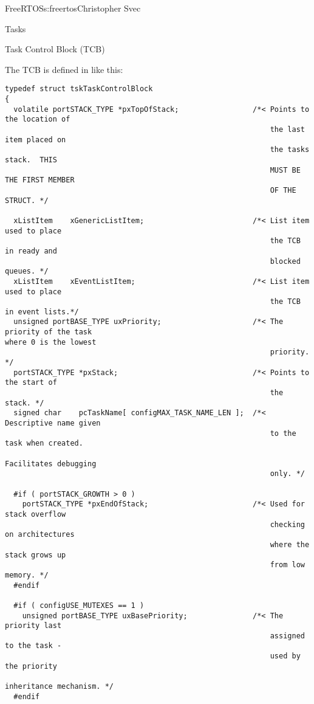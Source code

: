 \begin{aosachapter}{FreeRTOS}{s:freertos}{Christopher Svec}
\begin{aosasect1}{Tasks}
\begin{aosasect2}{Task Control Block (TCB)}

The TCB is defined in  like this:

\begin{verbatim}
typedef struct tskTaskControlBlock
{
  volatile portSTACK_TYPE *pxTopOfStack;                 /*< Points to the location of
                                                             the last item placed on 
                                                             the tasks stack.  THIS 
                                                             MUST BE THE FIRST MEMBER 
                                                             OF THE STRUCT. */
                                                         
  xListItem    xGenericListItem;                         /*< List item used to place 
                                                             the TCB in ready and 
                                                             blocked queues. */
  xListItem    xEventListItem;                           /*< List item used to place 
                                                             the TCB in event lists.*/
  unsigned portBASE_TYPE uxPriority;                     /*< The priority of the task                                                              where 0 is the lowest 
                                                             priority. */
  portSTACK_TYPE *pxStack;                               /*< Points to the start of 
                                                             the stack. */
  signed char    pcTaskName[ configMAX_TASK_NAME_LEN ];  /*< Descriptive name given 
                                                             to the task when created.
                                                             Facilitates debugging 
                                                             only. */

  #if ( portSTACK_GROWTH > 0 )
    portSTACK_TYPE *pxEndOfStack;                        /*< Used for stack overflow 
                                                             checking on architectures
                                                             where the stack grows up
                                                             from low memory. */
  #endif

  #if ( configUSE_MUTEXES == 1 )
    unsigned portBASE_TYPE uxBasePriority;               /*< The priority last 
                                                             assigned to the task - 
                                                             used by the priority 
                                                             inheritance mechanism. */
  #endif


\end{verbatim}
\end{aosasect2}
\end{aosasect1}
\end{aosachapter}
